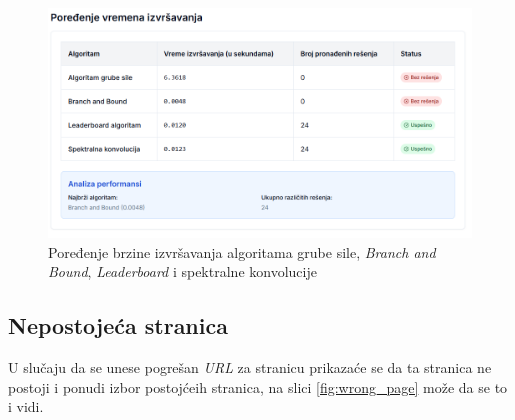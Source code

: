 \documentclass[12pt,oneside]{memoir}
\begin{document}
\begin{figure}[h]
\centering
\includegraphics[width=1\textwidth]{images/comparison.png}
\caption{Poređenje brzine izvršavanja algoritama grube sile, \emph{Branch and Bound}, \emph{Leaderboard} i spektralne konvolucije}
\label{fig:comparison}
\end{figure}

\subsection{Nepostojeća stranica}

U slučaju da se unese pogrešan \emph{URL} za stranicu prikazaće se da ta stranica ne postoji i ponudi izbor postojćeih stranica, na slici \ref{fig:wrong_page} može da se to i vidi.
\end{document}
